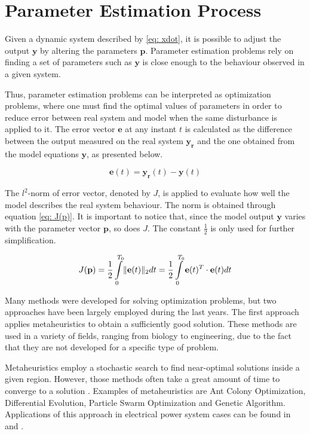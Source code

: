 \chapter{Parameter Estimation Process}
\label{ch: Estimation}

Given a dynamic system described by \eqref{eq: xdot}, it is possible to adjust the output $\mathbf{y}$ by altering the parameters $\mathbf{p}$. Parameter estimation problems rely on finding a set of parameters such as $\mathbf{y}$ is close enough to the behaviour observed in a given system.

Thus, parameter estimation problems can be interpreted as optimization problems, where one must find the optimal values of parameters in order to reduce error between real system and model when the same disturbance is applied to it. The error vector $\mathbf{e}$ at any instant $t$ is calculated as the difference between the output measured on the real system $\mathbf{y_{r}}$ and the one obtained from the model equations $\mathbf{y}$, as presented below.

\begin{equation}
	\mathbf{e}(t) = \mathbf{y_{r}}(t) - \mathbf{y}(t)
	\label{eq: error_vector}
\end{equation}

The $l^{2}$-norm of error vector, denoted by $J$, is applied to evaluate how well the model describes the real system behaviour. The norm is obtained through equation \eqref{eq: J(p)}. It is important to notice that, since the model output $\mathbf{y}$ varies with the parameter vector $\mathbf{p}$, so does $J$. The constant $\frac{1}{2}$ is only used for further simplification.

\begin{equation}
	J(\mathbf{p}) = \frac{1}{2} \int\displaylimits_{0}^{T_{0}}\lVert \mathbf{e}(t)\rVert_{2}dt = \frac{1}{2}\int\displaylimits_{0}^{T_{0}}\mathbf{e}(t)^{T}\cdot \mathbf{e}(t)dt
	\label{eq: J(p)}
\end{equation}

Many methods were developed for solving optimization problems, but two approaches have been largely employed during the last years. The first approach applies metaheuristics to obtain a sufficiently good solution. These methods are used in a variety of fields, ranging from biology to engineering, due to the fact that they are not developed for a specific type of problem.

Metaheuristics employ a stochastic search to find near-optimal solutions inside a given region. However, those methods often take a great amount of time to converge to a solution \cite{Blum2003}. Examples of metaheuristics are Ant Colony Optimization, Differential Evolution, Particle Swarm Optimization and Genetic Algorithm. Applications of this approach in electrical power system cases can be found in \cite{Todorovski2006} and \cite{Yoshida2000}.

